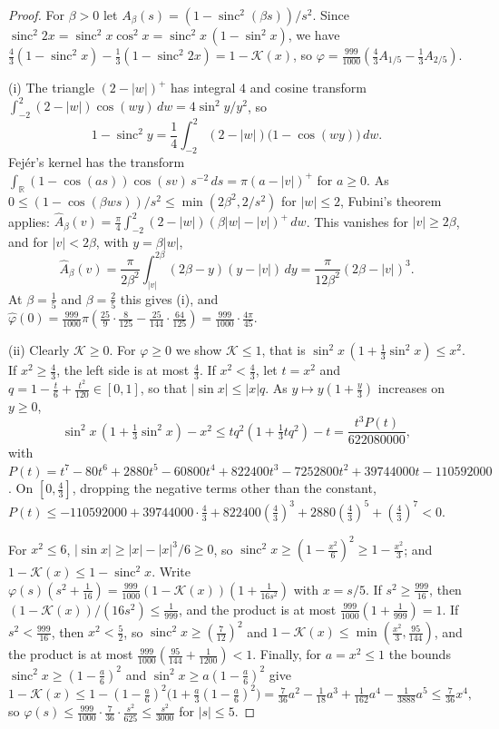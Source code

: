 \documentclass[11pt]{article}
\theoremstyle{definition}
\newcommand{\sinc}{\operatorname{sinc}}
\begin{document}
\begin{proof}
For $\beta > 0$ let $A_\beta(s) = (1 - \sinc^2(\beta s))/s^2$. Since $\sinc^2 2x = \sinc^2 x \cos^2 x = \sinc^2
x\,(1 - \sin^2 x)$, we have $\frac43(1 - \sinc^2 x) - \frac13(1 - \sinc^2 2x) = 1 - \mathcal K(x)$, so $\varphi =
\frac{999}{1000}(\frac43 A_{1/5} - \frac13 A_{2/5})$.

(i) The triangle $(2 - |w|)^+$ has integral $4$ and cosine transform $\int_{-2}^{2} (2 - |w|) \cos(wy)\,dw = 4
\sin^2 y/y^2$, so
\begin{equation}\label{eq:mix}
1 - \sinc^2 y = \frac14 \int_{-2}^{2} (2 - |w|)\big(1 - \cos(wy)\big)\,dw .
\end{equation}
Fejér's kernel has the transform $\int_{\mathbb R} (1 - \cos(as)) \cos(sv)\,s^{-2}\,ds = \pi(a - |v|)^+$ for $a \ge 0$.
As $0 \le (1 - \cos(\beta w s))/s^2 \le \min(2\beta^2, 2/s^2)$ for $|w| \le 2$, Fubini's theorem applies:
$\hat A_\beta(v) = \frac\pi4 \int_{-2}^{2} (2 - |w|)(\beta|w| - |v|)^+\,dw$. This vanishes for $|v| \ge 2\beta$, and for
$|v| < 2\beta$, with $y = \beta|w|$,
\[
\hat A_\beta(v) = \frac{\pi}{2\beta^2} \int_{|v|}^{2\beta} (2\beta - y)(y - |v|)\,dy = \frac{\pi}{12\beta^2} (2\beta -
|v|)^3 .
\]
At $\beta = \frac15$ and $\beta = \frac25$ this gives (i), and $\hat\varphi(0) = \frac{999}{1000}\pi(\frac{25}{9} \cdot
\frac{8}{125} - \frac{25}{144} \cdot \frac{64}{125}) = \frac{999}{1000} \cdot \frac{4\pi}{45}$.

(ii) Clearly $\mathcal K \ge 0$. For $\varphi \ge 0$ we show $\mathcal K \le 1$, that is $\sin^2 x\,(1 + \frac13
\sin^2 x) \le x^2$. If $x^2 \ge \frac43$, the left side is at most $\frac43$. If $x^2 < \frac43$, let $t = x^2$ and $q
= 1 - \frac t6 + \frac{t^2}{120} \in [0, 1]$, so that $|\sin x|
\le |x| q$. As $y \mapsto y(1 + \frac y3)$ increases on $y \ge 0$,
\[
\sin^2 x\,(1 + \tfrac13 \sin^2 x) - x^2 \le tq^2(1 + \tfrac13 tq^2) - t = \frac{t^3 P(t)}{622080000},
\]
with $P(t) = t^7 - 80t^6 + 2880t^5 - 60800t^4 + 822400t^3 - 7252800t^2 + 39744000t - 110592000$. On $[0, \frac43]$,
dropping the negative terms other than the constant, $P(t) \le -110592000 + 39744000 \cdot \frac43 + 822400
(\frac43)^3 + 2880 (\frac43)^5 + (\frac43)^7 < 0$.

For $x^2 \le 6$, $|\sin x| \ge |x| - |x|^3/6 \ge 0$, so $\sinc^2 x \ge (1 - \frac{x^2}6)^2 \ge 1 - \frac{x^2}3$; and
$1 - \mathcal K(x) \le 1 - \sinc^2 x$. Write $\varphi(s)(s^2 + \frac1{16}) = \frac{999}{1000}(1 - \mathcal K(x))(1 +
\frac{1}{16s^2})$ with $x = s/5$. If $s^2 \ge \frac{999}{16}$, then $(1 - \mathcal K(x))/(16s^2) \le \frac{1}{999}$,
and the product is at most $\frac{999}{1000}(1 + \frac1{999}) = 1$. If $s^2 < \frac{999}{16}$, then $x^2 < \frac52$, so
$\sinc^2 x \ge (\frac{7}{12})^2$ and $1 - \mathcal K(x) \le \min(\frac{x^2}{3}, \frac{95}{144})$, and the product is at
most $\frac{999}{1000}(\frac{95}{144} + \frac{1}{1200}) < 1$. Finally, for $a = x^2 \le 1$ the bounds $\sinc^2 x \ge
(1 - \frac a6)^2$ and $\sin^2 x \ge a(1 - \frac a6)^2$ give
\[
1 - \mathcal K(x) \le 1 - (1 - \tfrac a6)^2\big(1 + \tfrac a3 (1 - \tfrac a6)^2\big) = \tfrac{7}{36}a^2 -
\tfrac{1}{18}a^3 + \tfrac{1}{162}a^4 - \tfrac{1}{3888}a^5 \le \tfrac{7}{36}x^4,
\]
so $\varphi(s) \le \frac{999}{1000} \cdot \frac{7}{36} \cdot \frac{s^2}{625} \le \frac{s^2}{3000}$ for $|s| \le 5$.


\end{proof}
\end{document}
